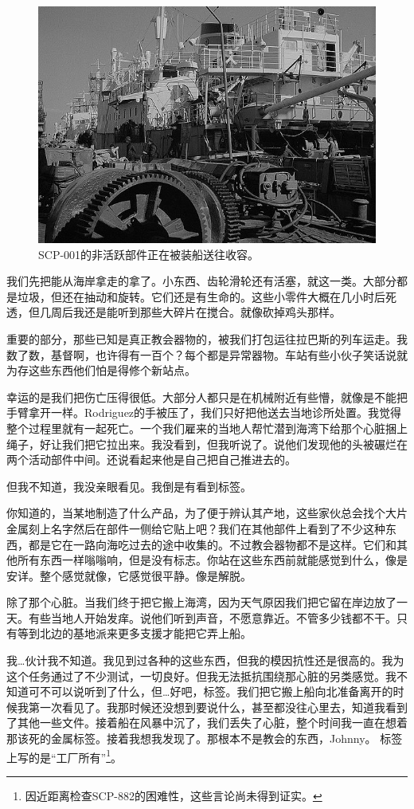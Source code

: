 
\begin{figure}[H]
	\centering
	\includegraphics[width=0.5\linewidth]{images/SCP.001.the.broken.god.9.jpg}
	\caption*{SCP-001的非活跃部件正在被装船送往收容。}
\end{figure}

\begin{scpbox}

我们先把能从海岸拿走的拿了。小东西、齿轮滑轮还有活塞，就这一类。大部分都是垃圾，但还在抽动和旋转。它们还是有生命的。这些小零件大概在几小时后死透，但几周后我还是能听到那些大碎片在搅合。就像砍掉鸡头那样。

重要的部分，那些已知是真正教会器物的，被我们打包运往拉巴斯的列车运走。我数了数，基督啊，也许得有一百个？每个都是异常器物。车站有些小伙子笑话说就为存这些东西他们怕是得修个新站点。

幸运的是我们把伤亡压得很低。大部分人都只是在机械附近有些懵，就像是不能把手臂拿开一样。Rodriguez的手被压了，我们只好把他送去当地诊所处置。我觉得整个过程里就有一起死亡。一个我们雇来的当地人帮忙潜到海湾下给那个心脏捆上绳子，好让我们把它拉出来。我没看到，但我听说了。说他们发现他的头被碾烂在两个活动部件中间。还说看起来他是自己把自己推进去的。

但我不知道，我没亲眼看见。我倒是有看到标签。

你知道的，当某地制造了什么产品，为了便于辨认其产地，这些家伙总会找个大片金属刻上名字然后在部件一侧给它贴上吧？我们在其他部件上看到了不少这种东西，都是它在一路向海吃过去的途中收集的。不过教会器物都不是这样。它们和其他所有东西一样嗡嗡响，但是没有标志。你站在这些东西前就能感觉到什么，像是安详。整个感觉就像，它感觉很平静。像是解脱。

除了那个心脏。当我们终于把它搬上海湾，因为天气原因我们把它留在岸边放了一天。有些当地人开始发痒。说他们听到声音，不愿意靠近。不管多少钱都不干。只有等到北边的基地派来更多支援才能把它弄上船。

我…伙计我不知道。我见到过各种的这些东西，但我的模因抗性还是很高的。我为这个任务通过了不少测试，一切良好。但我无法抵抗围绕那心脏的另类感觉。我不知道可不可以说听到了什么，但…好吧，标签。我们把它搬上船向北准备离开的时候我第一次看见了。我那时候还没想到要说什么，甚至都没往心里去，知道我看到了其他一些文件。接着船在风暴中沉了，我们丢失了心脏，整个时间我一直在想着那该死的金属标签。接着我想我发现了。那根本不是教会的东西，Johnny。
标签上写的是“工厂所有”\footnote{因近距离检查SCP-882的困难性，这些言论尚未得到证实。}。

\end{scpbox}

